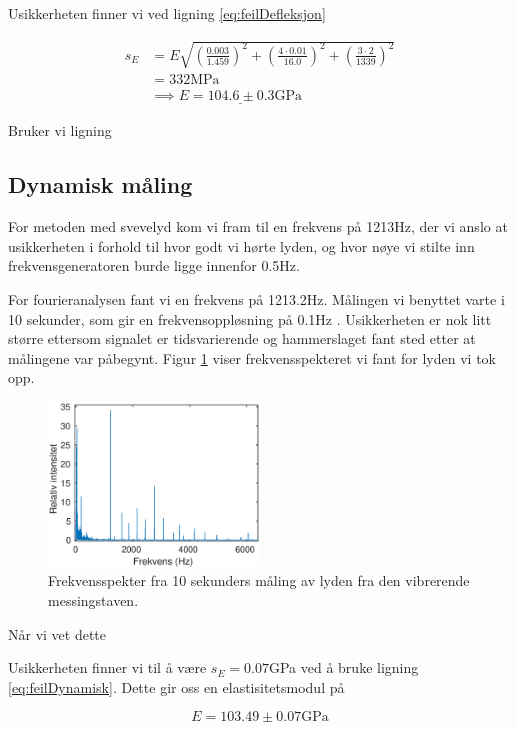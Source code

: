 \documentclass[a4paper,11pt, twocolumn]{article}
\begin{document}
Usikkerheten finner vi ved ligning \eqref{eq:feilDefleksjon}

\begin{align}
	s_E &= E\sqrt{\left(\frac{0.003}{1.459}\right)^2+\left(\frac{4\cdot0.01}{16.0}\right)^2+\left(\frac{3\cdot 2}{1339}\right)^2}\\
	&= 332\text{MPa}\\
	&\implies \underline{E = 104.6\pm0.3\text{GPa}}
\end{align}

Bruker vi ligning


\subsection{Dynamisk måling}
For metoden med svevelyd kom vi fram til en frekvens på 1213Hz, der vi anslo at usikkerheten i forhold til hvor godt vi hørte lyden, og hvor nøye vi stilte inn frekvensgeneratoren burde ligge innenfor 0.5Hz. 

For fourieranalysen fant vi en frekvens på 1213.2Hz. Målingen vi benyttet varte i 10 sekunder, som gir en frekvensoppløsning på 0.1Hz \cite{vistnes4}. Usikkerheten er nok litt større ettersom signalet er tidsvarierende og hammerslaget fant sted etter at målingene var påbegynt. Figur \ref{fig:frekvensspekter} viser frekvensspekteret vi fant for lyden vi tok opp.

\begin{figure}[!ht]
	\includegraphics[width = 0.5\textwidth]{matlab/frekvensspekter.eps}
	\caption{Frekvensspekter fra 10 sekunders måling av lyden fra den vibrerende messingstaven.}
	\label{fig:frekvensspekter}
\end{figure}

Når vi vet dette 

Usikkerheten finner vi til å være $s_E = 0.07$GPa ved å bruke ligning \ref{eq:feilDynamisk}. Dette gir oss en elastisitetsmodul på

\begin{equation}
	E = 103.49\pm0.07\text{GPa}
\end{equation}
\end{document}
